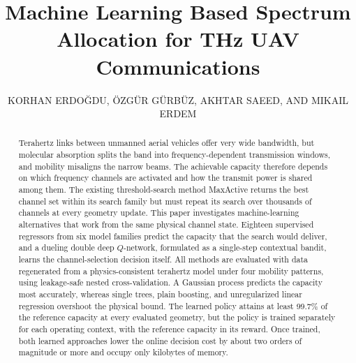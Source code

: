 \documentclass{ieee-ojvt}
\begin{document}

\title{Machine Learning Based Spectrum Allocation for THz UAV Communications}

\author{KORHAN ERDO\u{G}DU, \"OZG\"UR G\"URB\"UZ,
AKHTAR SAEED, AND MIKAIL ERDEM}

\begin{abstract}
Terahertz links between unmanned aerial vehicles offer very wide bandwidth, but molecular
absorption splits the band into frequency-dependent transmission windows, and mobility
misaligns the narrow beams. The achievable capacity therefore depends on which frequency
channels are activated and how the transmit power is shared among them. The existing
threshold-search method MaxActive returns the best channel set within its search family
but must repeat its search over thousands of channels at every geometry update. This
paper investigates machine-learning alternatives that work from the same physical channel
state. Eighteen supervised regressors from six model families predict the capacity that
the search would deliver, and a dueling double deep $Q$-network, formulated as a
single-step contextual bandit, learns the channel-selection decision itself. All methods
are evaluated with data regenerated from a physics-consistent terahertz model under four
mobility patterns, using leakage-safe nested cross-validation. A Gaussian process predicts
the capacity most accurately, whereas single trees, plain boosting, and unregularized
linear regression overshoot the physical bound. The learned policy attains at least
99.7\% of the reference capacity at every evaluated geometry, but the policy is trained
separately for each operating context, with the reference capacity in its reward. Once
trained, both learned approaches lower the online decision cost by about two orders of
magnitude or more and occupy only kilobytes of memory.
\end{abstract}
\end{document}
